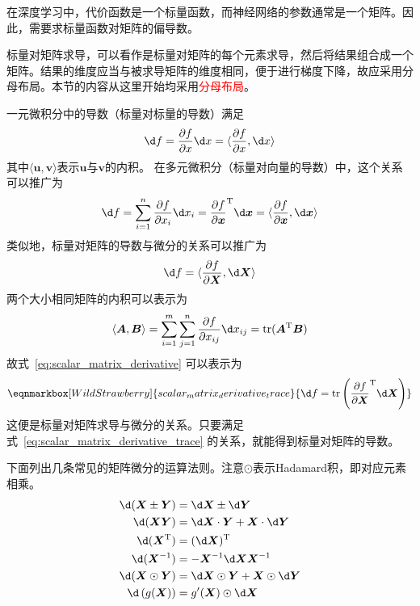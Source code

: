 在深度学习中，代价函数是一个标量函数，而神经网络的参数通常是一个矩阵。因此，需要求标量函数对矩阵的偏导数。

标量对矩阵求导，可以看作是标量对矩阵的每个元素求导，然后将结果组合成一个矩阵。结果的维度应当与被求导矩阵的维度相同，便于进行梯度下降，故应采用分母布局。本节的内容从这里开始均采用\textcolor{red}{分母布局}。

一元微积分中的导数（标量对标量的导数）满足
\begin{equation}
	\d f 
	= \frac{\partial f}{\partial x}\d x
	= \langle \frac{\partial f}{\partial x}, \d x \rangle
\end{equation}
其中$\langle \bm{u}, \bm{v} \rangle$表示$\bm{u}$与$\bm{v}$的内积。
在多元微积分（标量对向量的导数）中，这个关系可以推广为
\begin{equation}
	\d f
	= \sum_{i=1}^{n}{\frac{\partial f}{\partial x_i}\d x_i} 
	= {\frac{\partial f}{\partial \bm{x}}}^{\mathrm{T}}\d \bm{x}
	= \langle \frac{\partial f}{\partial \bm{x}}, \d \bm{x} \rangle
\end{equation}
类似地，标量对矩阵的导数与微分的关系可以推广为
\begin{equation}
	\d f
	= \langle \frac{\partial f}{\partial \bm{X}}, \d \bm{X} \rangle
	\label{eq:scalar_matrix_derivative}
\end{equation}
两个大小相同矩阵的内积可以表示为
\begin{equation}
	\langle \bm{A}, \bm{B} \rangle 
	= \sum_{i=1}^{m}{\sum_{j=1}^{n}{\frac{\partial f}{\partial x_{ij}}\d x_{ij}}} 
	= \mathrm{tr}(\bm{A}^{\mathrm{T}}\bm{B})
\end{equation}
故式~\eqref{eq:scalar_matrix_derivative} 可以表示为
\begin{equation}
	\eqnmarkbox[WildStrawberry]{scalar_matrix_derivative_trace}{
	\d f 
	= \mathrm{tr}\left({\frac{\partial f}{\partial \bm{X}}}^{\mathrm{T}}\d \bm{X}\right)
	}
	\label{eq:scalar_matrix_derivative_trace}
\end{equation}
这便是标量对矩阵求导与微分的关系。只要满足式~\eqref{eq:scalar_matrix_derivative_trace} 的关系，就能得到标量对矩阵的导数。

下面列出几条常见的矩阵微分的运算法则。注意$\odot$表示Hadamard积，即对应元素相乘。
\begin{subequations}
	\begin{align}
		\d (\bm{X}\pm \bm{Y}) &= \d \bm{X} \pm \d \bm{Y} 
		\label{eq:matrix_derivative_add_sub} \\
		\d (\bm{XY}) &= \d \bm{X}\cdot \bm{Y} + \bm{X}\cdot \d \bm{Y}
		\label{eq:matrix_derivative_mul} \\
		\d (\bm{X}^{\mathrm{T}}) &= (\d \bm{X})^{\mathrm{T}}
		\label{eq:matrix_derivative_transpose} \\
		\d (\bm{X}^{-1}) &= -\bm{X}^{-1}\d \bm{X}\bm{X}^{-1}
		\label{eq:matrix_derivative_inverse} \\
		\d (\bm{X}\odot \bm{Y}) &= \d \bm{X}\odot \bm{Y} + \bm{X}\odot \d \bm{Y}
		\label{eq:matrix_derivative_hadamard} \\
		\d \left(g(\bm{X})\right) &= g'(\bm{X}) \odot \d \bm{X}
		\label{eq:matrix_derivative_hadamard2}
	\end{align}
\end{subequations}

